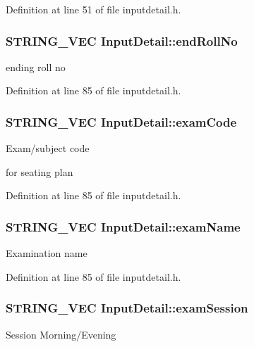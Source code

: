 Definition at line 51 of file inputdetail.\-h.

\hypertarget{classInputDetail_abc3249eab8fbf895620deff0a9349333}{
\subsubsection[{end\-Roll\-No}]{\setlength{\rightskip}{0pt plus 5cm}S\-T\-R\-I\-N\-G\-\_\-\-V\-E\-C Input\-Detail\-::end\-Roll\-No\hspace{0.3cm}{\ttfamily [protected]}}}\label{classInputDetail_abc3249eab8fbf895620deff0a9349333}
ending roll no 

Definition at line 85 of file inputdetail.\-h.

\hypertarget{classInputDetail_ac48c0170ce354d3cd188ddc2e83e2c67}{
\subsubsection[{exam\-Code}]{\setlength{\rightskip}{0pt plus 5cm}S\-T\-R\-I\-N\-G\-\_\-\-V\-E\-C Input\-Detail\-::exam\-Code\hspace{0.3cm}{\ttfamily [protected]}}}\label{classInputDetail_ac48c0170ce354d3cd188ddc2e83e2c67}
\begin{DoxyVerb}                         Exam/subject code 
\end{DoxyVerb}
 for seating plan 

Definition at line 85 of file inputdetail.\-h.

\hypertarget{classInputDetail_a7b4e4a2a26f23da75d9928601a88a1d9}{
\subsubsection[{exam\-Name}]{\setlength{\rightskip}{0pt plus 5cm}S\-T\-R\-I\-N\-G\-\_\-\-V\-E\-C Input\-Detail\-::exam\-Name\hspace{0.3cm}{\ttfamily [protected]}}}\label{classInputDetail_a7b4e4a2a26f23da75d9928601a88a1d9}
Examination name 

Definition at line 85 of file inputdetail.\-h.

\hypertarget{classInputDetail_a4501d1379c278965497abf21d369ad9e}{
\subsubsection[{exam\-Session}]{\setlength{\rightskip}{0pt plus 5cm}S\-T\-R\-I\-N\-G\-\_\-\-V\-E\-C Input\-Detail\-::exam\-Session\hspace{0.3cm}{\ttfamily [protected]}}}\label{classInputDetail_a4501d1379c278965497abf21d369ad9e}
Session Morning/\-Evening 

